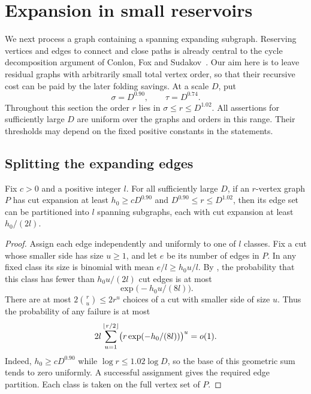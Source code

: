 \section{Expansion in small reservoirs}\label{sec:residue}

We next process a graph containing a spanning expanding subgraph.
Reserving vertices and edges to connect and close paths is already
central to the cycle decomposition argument of Conlon, Fox and
Sudakov~\cite[Section~3]{CFS2014}. Our aim here is to leave residual
graphs with arbitrarily small total vertex order, so that their
recursive cost can be paid by the later folding savings. At a scale $D$, put
\[
  \sigma=D^{0.90},\qquad \tau=D^{0.74}.
\]
Throughout this section the order $r$ lies in
$\sigma\le r\le D^{1.02}$.  All assertions for sufficiently large $D$
are uniform over the graphs and orders in this range.  Their thresholds
may depend on the fixed positive constants in the statements.

\subsection{Splitting the expanding edges}

\begin{lemma}\label{lem:edge-split}
Fix $c>0$ and a positive integer $l$.  For all sufficiently large $D$,
if an $r$-vertex graph $P$ has cut expansion at least
$h_0\ge cD^{0.90}$ and $D^{0.90}\le r\le D^{1.02}$, then its edge set
can be partitioned into $l$ spanning subgraphs, each with cut expansion
at least $h_0/(2l)$.
\end{lemma}

\begin{proof}
Assign each edge independently and uniformly to one of $l$ classes.
Fix a cut whose smaller side has size $u\ge1$, and let $e$ be its
number of edges in $P$.  In any fixed class its size is binomial with
mean $e/l\ge h_0u/l$.  By , the probability that
this class has fewer than $h_0u/(2l)$ cut edges is at most
\[
  \exp\bigl(-h_0u/(8l)\bigr).
\]
There are at most $2\binom ru\le2r^u$ choices of a cut with smaller
side of size $u$.  Thus the probability of any failure is at most
\[
  2l\sum_{u=1}^{\left\lfloor r/2\right\rfloor}
       \bigl(r\exp(-h_0/(8l))\bigr)^u=o(1).
\]
Indeed, $h_0\ge cD^{0.90}$ while $\log r\le1.02\log D$, so the base
of this geometric sum tends to zero uniformly.  A successful
assignment gives the required edge partition.  Each class is taken on
the full vertex set of $P$.
\end{proof}


